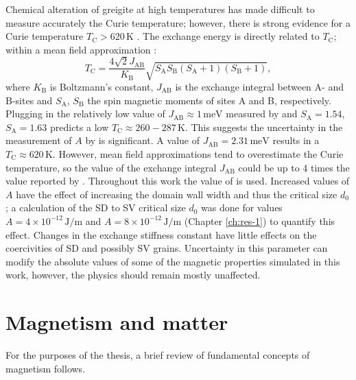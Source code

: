 Chemical alteration of greigite at high temperatures has made difficult to measure accurately the Curie temperature; however, there is strong evidence for a Curie temperature $T_\text{C}>620\,\text{K}$ \citep{Roberts2010}. The exchange energy is directly related to $T_\text{C}$; within a mean field approximation \citep{Kouvel1956}:
\begin{equation}
T_\text{C} = \frac{4\sqrt{2} J_\text{AB}}{K_\text{B}}\sqrt{S_\text{A}S_\text{B}(S_\text{A}+1)(S_\text{B}+1)},
\end{equation}
where $K_\text{B}$ is Boltzmann's constant, $J_\text{AB}$ is the exchange integral between A- and B-sites and $S_\text{A},\, S_\text{B}$ the spin magnetic moments of sites A and B, respectively. Plugging in the relatively low value of $J_\text{AB}\approx 1\,\text{meV}$ measured by \citet{Chang2008} and $S_\text{A}=1.54$, $S_\text{A}=1.63$ \citep{Chang2009} predicts a low $T_\text{C} \approx 260-287 \, \text{K}$. This suggests the uncertainty in the measurement of $A$ by \citet{Chang2008} is significant. A value of $J_\text{AB}=2.31\,\text{meV}$ results in a $T_\text{C}\approx 620\,\text{K}$. However, mean field approximations tend to overestimate the Curie temperature, so the value of the exchange integral $J_\text{AB}$ could be up to 4 times the value reported by \citet{Chang2008}. Throughout this work the value of \citet{Chang2008} is used. Increased values of $A$ have the effect of increasing the domain wall width and thus the critical size $d_0$; a calculation of the SD to SV critical size $d_0$ was done for values $A=4\times10^{-12}\,\text{J}/\text{m}$ and $A=8\times10^{-12}\,\text{J}/\text{m}$ (Chapter \ref{ch:res-1}) to quantify this effect. Changes in the exchange stiffness constant have little effects on the coercivities of SD and possibly SV grains. Uncertainty in this parameter can modify the absolute values of some of the magnetic properties simulated in this work, however, the physics should remain mostly unaffected.\par

\section{Magnetism and matter}
For the purposes of the thesis, a brief review of fundamental concepts of magnetism follows.\par
 
